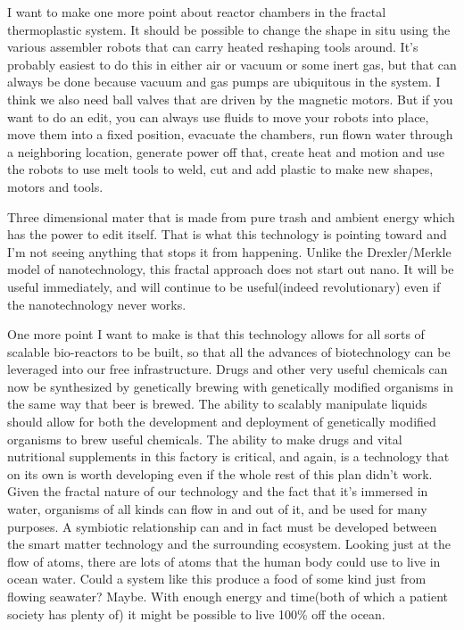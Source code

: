 I want to make one more point about reactor chambers in the fractal
thermoplastic system. It should be possible to change the shape in situ
using the various assembler robots that can carry heated reshaping tools
around. It's probably easiest to do this in either air or vacuum or some
inert gas, but that can always be done because vacuum and gas pumps are
ubiquitous in the system. I think we also need ball valves that are
driven by the magnetic motors. But if you want to do an edit, you can
always use fluids to move your robots into place, move them into a fixed
position, evacuate the chambers, run flown water through a neighboring
location, generate power off that, create heat and motion and use the
robots to use melt tools to weld, cut and add plastic to make new
shapes, motors and tools.

Three dimensional mater that is made from pure trash and ambient energy
which has the power to edit itself. That is what this technology is
pointing toward and I'm not seeing anything that stops it from
happening. Unlike the Drexler/Merkle model of nanotechnology, this
fractal approach does not start out nano. It will be useful immediately,
and will continue to be useful(indeed revolutionary) even if the
nanotechnology never works.

One more point I want to make is that this technology allows for all
sorts of scalable bio-reactors to be built, so that all the advances of
biotechnology can be leveraged into our free infrastructure. Drugs and
other very useful chemicals can now be synthesized by genetically
brewing with genetically modified organisms in the same way that beer is
brewed. The ability to scalably manipulate liquids should allow for both
the development and deployment of genetically modified organisms to brew
useful chemicals. The ability to make drugs and vital nutritional
supplements in this factory is critical, and again, is a technology that
on its own is worth developing even if the whole rest of this plan
didn't work. Given the fractal nature of our technology and the fact
that it's immersed in water, organisms of all kinds can flow in and out
of it, and be used for many purposes. A symbiotic relationship can and
in fact must be developed between the smart matter technology and the
surrounding ecosystem. Looking just at the flow of atoms, there are lots
of atoms that the human body could use to live in ocean water. Could a
system like this produce a food of some kind just from flowing seawater?
Maybe. With enough energy and time(both of which a patient society has
plenty of) it might be possible to live 100\% off the ocean.

